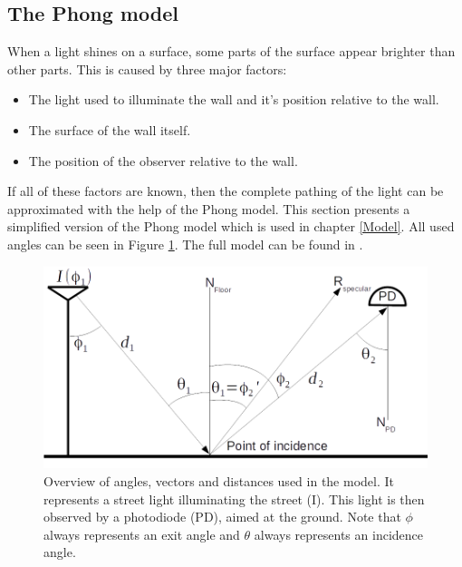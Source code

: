 \subsection{The Phong model}
\label{Model_explained}
When a light shines on a surface, some parts of the surface appear brighter than other parts. This is caused by three major factors:
\begin{itemize}[itemsep=-1ex,topsep=0pt]
	\item The light used to illuminate the wall and it's position relative to the wall.
	\item The surface of the wall itself.
	\item The position of the observer relative to the wall.
\end{itemize}
If all of these factors are known, then the complete pathing of the light can be approximated with the help of the Phong model. This section presents a simplified version of the Phong model which is used in chapter \ref{Model}. All used angles can be seen in Figure \ref{fig:model_overview}. The full model can be found in \cite{Advances_In_Optical_Communication}.

\begin{figure}
	\includegraphics[width=\textwidth]{pics/single_light_post.png}
	\caption{Overview of angles, vectors and distances used in the model. It represents a street light illuminating the street (I). This light is then observed by a photodiode (PD), aimed at the ground. Note that $\phi$ always represents an exit angle and $\theta$ always represents an incidence angle.\label{fig:model_overview}}
\end{figure}

